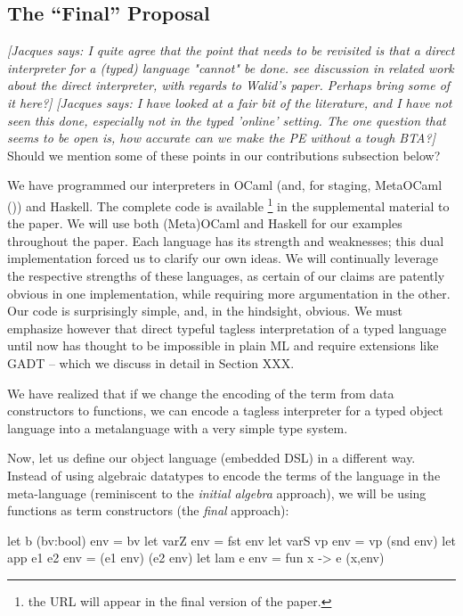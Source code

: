\documentclass[preprint]{sigplanconf}
\newcommand{\jacques}[1]{{\it [Jacques says: #1]}}
\let\cite=\citep
\begin{document}
\subsection{The ``Final'' Proposal}\label{ourapproach}

\jacques{I quite agree that the point that needs to be revisited is
  that a \emph{direct} interpreter for a (typed) language "cannot" be
  done. see discussion in related work about the direct interpreter,
  with regards to Walid's paper. Perhaps bring some of it here?}
\jacques{I have looked at a fair bit of the literature, and I have not
  seen this done, especially not in the typed 'online' setting.  The
  one question that seems to be open is, how accurate can we make the
  PE without a tough BTA?}
Should we mention some of these points in our contributions subsection
below?



We have programmed our interpreters in OCaml (and, for staging,
MetaOCaml (\cite{metaocaml})) and Haskell. The complete code is available 
\footnote{the URL will appear in the final version of the paper.}
in the supplemental material to the paper. We will use both
(Meta)OCaml and Haskell for our examples throughout the paper.
Each language has its strength and weaknesses; this dual implementation
forced us to clarify our own ideas.  We will continually leverage the
respective strengths of these languages, as certain of our claims are
patently obvious in one implementation, while requiring more argumentation
in the other.
Our code is surprisingly simple, and, in the hindsight, obvious. We
must emphasize however that direct typeful tagless interpretation of a typed
language until now has thought to be impossible in plain ML and
require extensions like GADT -- which we discuss in detail in Section
XXX.

We have realized that if we change the encoding of the term from data
constructors to functions, we can encode a tagless interpreter for a
typed object language into a metalanguage with a very simple type system.

Now, let us define our object language (embedded DSL) in a different
way. Instead of using algebraic datatypes to encode the terms of the
language in the meta-language (reminiscent to the \emph{initial algebra} 
approach), we will be using functions as term constructors (the \emph{final}
approach):

\begin{code}
  let b (bv:bool) env  = bv
  let varZ env         = fst env
  let varS vp env      = vp (snd env)
  let app e1 e2 env    = (e1 env) (e2 env)
  let lam e env        = fun x -> e (x,env)
\end{code}
\end{document}
